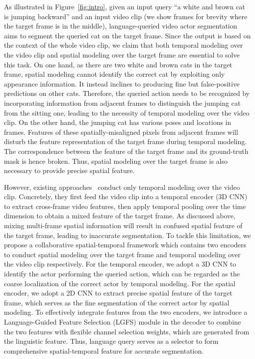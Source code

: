 \documentclass[final]{cvpr}
\begin{document}
As illustrated in Figure~\ref{fig:intro}, given an input query ``a white and brown cat is jumping backward'' and an input video clip (we show  frames for brevity where the target frame is in the middle), language-queried video actor segmentation aims to segment the queried cat on the target frame. 
Since the output is based on the context of the whole video clip, we claim that both temporal modeling over the video clip and spatial modeling over the target frame are essential to solve this task. 
On one hand, as there are two white and brown cats in the target frame, spatial modeling cannot identify the correct cat by exploiting only appearance information. 
It instead inclines to producing fine but false-positive predictions on other cats. 
Therefore, the queried action needs to be recognized by incorporating information from adjacent frames to distinguish the jumping cat from the sitting one, leading to the necessity of temporal modeling over the video clip. 
On the other hand, the jumping cat has various poses and locations in  frames. 
Features of these spatially-misaligned pixels from adjacent frames will disturb the feature representation of the target frame during temporal modeling. 
The correspondence between the feature of the target frame and its ground-truth mask is hence broken. 
Thus, spatial modeling over the target frame is also necessary to provide precise spatial feature.

However, existing approaches~\cite{gavrilyuk2018actor, wang2019asymmetric, mcintosh2020visual, wang2020context,ning2020polar} conduct only temporal modeling over the video clip. 
Concretely, they first feed the video clip into a temporal encoder (3D CNN) to extract cross-frame video features, then apply temporal pooling over the time dimension to obtain a mixed feature of the target frame.
As discussed above, mixing multi-frame spatial information will result in confused spatial feature of the target frame, leading to inaccurate segmentation. 
To tackle this limitation, we propose a collaborative spatial-temporal framework which contains two encoders to conduct spatial modeling over the target frame and temporal modeling over the video clip respectively. 
For the temporal encoder, we adopt a 3D CNN to identify the actor performing the queried action, which can be regarded as the coarse localization of the correct actor by temporal modeling. 
For the spatial encoder, we adopt a 2D CNN to extract precise spatial feature of the target frame, which serves as the fine segmentation of the correct actor by spatial modeling. 
To effectively integrate features from the two encoders, we introduce a Language-Guided Feature Selection (LGFS) module in the decoder to combine the two features with flexible channel selection weights, which are generated from the linguistic feature. 
Thus, language query serves as a selector to form comprehensive spatial-temporal feature for accurate segmentation. 
\end{document}
